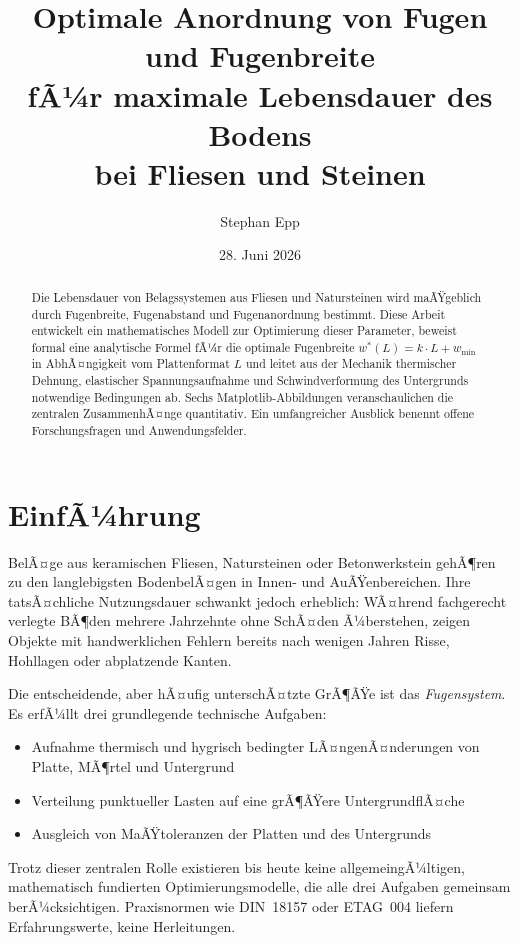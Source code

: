 ﻿\documentclass[a4paper,12pt]{article}
\title{Optimale Anordnung von Fugen und Fugenbreite\\
fÃ¼r maximale Lebensdauer des Bodens\\
bei Fliesen und Steinen}
\author{Stephan Epp}
\date{28. Juni 2026}
\theoremstyle{definition}
\begin{document}
\maketitle

\begin{abstract}
Die Lebensdauer von Belagssystemen aus Fliesen und Natursteinen wird maÃŸgeblich
durch Fugenbreite, Fugenabstand und Fugenanordnung bestimmt. Diese Arbeit
entwickelt ein mathematisches Modell zur Optimierung dieser Parameter,
beweist formal eine analytische Formel fÃ¼r die optimale Fugenbreite
$w^*(L) = k \cdot L + w_{\min}$ in AbhÃ¤ngigkeit vom Plattenformat $L$
und leitet aus der Mechanik thermischer Dehnung,
elastischer Spannungsaufnahme und Schwind\-verformung des Untergrunds
notwendige Bedingungen ab. Sechs Matplotlib-Abbildungen veranschaulichen
die zentralen ZusammenhÃ¤nge quantitativ. Ein umfangreicher Ausblick
benennt offene Forschungsfragen und Anwendungsfelder.
\end{abstract}

\tableofcontents
\newpage

\section{EinfÃ¼hrung}

BelÃ¤ge aus keramischen Fliesen, Natursteinen oder Betonwerkstein gehÃ¶ren zu den
langlebigsten BodenbelÃ¤gen in Innen- und AuÃŸenbereichen. Ihre tatsÃ¤chliche
Nutzungsdauer schwankt jedoch erheblich: WÃ¤hrend fachgerecht verlegte BÃ¶den
mehrere Jahrzehnte ohne SchÃ¤den Ã¼berstehen, zeigen Objekte mit
handwerklichen Fehlern bereits nach wenigen Jahren Risse, Hohllagen
oder abplatzende Kanten.

Die entscheidende, aber hÃ¤ufig unterschÃ¤tzte GrÃ¶ÃŸe ist das \emph{Fugensystem}.
Es erfÃ¼llt drei grundlegende technische Aufgaben:
\begin{itemize}
	\item Aufnahme thermisch und hygrisch bedingter LÃ¤ngenÃ¤nderungen von
	      Platte, MÃ¶rtel und Untergrund
	\item Verteilung punktueller Lasten auf eine grÃ¶ÃŸere UntergrundflÃ¤che
	\item Ausgleich von MaÃŸtoleranzen der Platten und des Untergrunds
\end{itemize}

Trotz dieser zentralen Rolle existieren bis heute keine allgemeingÃ¼ltigen,
mathematisch fundierten Optimierungsmodelle, die alle drei Aufgaben
gemeinsam berÃ¼cksichtigen. Praxisnormen wie DIN~18157 \cite{din18157}
oder ETAG~004 \cite{etag004} liefern Erfahrungswerte, keine Herleitungen.
\end{document}
